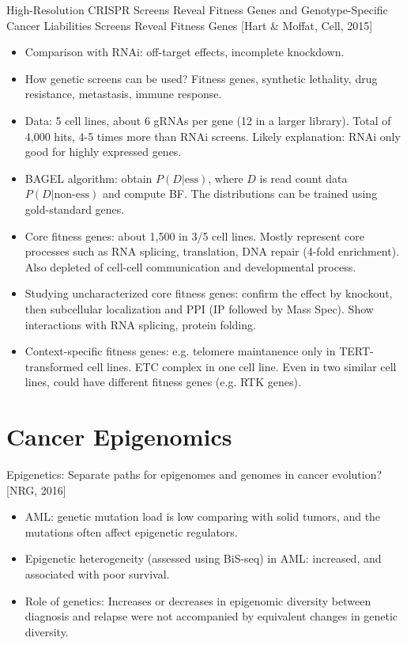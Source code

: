 \documentclass{report}
\begin{document}
High-Resolution CRISPR Screens Reveal Fitness Genes and Genotype-Specific Cancer Liabilities Screens Reveal Fitness Genes [Hart \& Moffat, Cell, 2015]
\begin{itemize}
	
	\item Comparison with RNAi: off-target effects, incomplete knockdown.
	
	\item How genetic screens can be used? Fitness genes, synthetic lethality, drug resistance, metastasis, immune response.
	
	\item Data: 5 cell lines, about 6 gRNAs per gene (12 in a larger library). Total of 4,000 hits, 4-5 times more than RNAi screens. Likely explanation: RNAi only good for highly expressed genes.
	
	\item BAGEL algorithm: obtain $P(D|\text{ess})$, where $D$ is read count data $P(D|\text{non-ess})$ and compute BF. The distributions can be trained using gold-standard genes.
	
	\item Core fitness genes: about 1,500 in 3/5 cell lines. Mostly represent core processes such as RNA splicing, translation, DNA repair (4-fold enrichment). Also depleted of cell-cell communication and developmental process.
	
	\item Studying uncharacterized core fitness genes: confirm the effect by knockout, then subcellular localization and PPI (IP followed by Mass Spec). Show interactions with RNA splicing, protein folding.
	
	\item Context-specific fitness genes: e.g. telomere maintanence only in TERT-transformed cell lines. ETC complex in one cell line. Even in two similar cell lines, could have different fitness genes (e.g. RTK genes).
\end{itemize}

\section{Cancer Epigenomics}
Epigenetics: Separate paths for epigenomes and genomes in cancer evolution? [NRG, 2016]
\begin{itemize}
	
	\item AML: genetic mutation load is low comparing with solid tumors, and the mutations often affect epigenetic regulators. 
	
	\item Epigenetic heterogeneity (assessed using BiS-seq) in AML: increased, and associated with poor survival. 
	
	\item Role of genetics: Increases or decreases in epigenomic diversity between diagnosis and relapse were not accompanied by equivalent changes in genetic diversity. 
\end{itemize}
\end{document}
